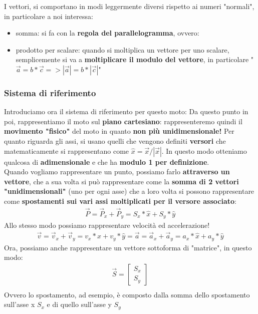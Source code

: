 				I vettori, si comportano in modi leggermente diversi rispetto ai numeri "normali", in particolare a noi interessa:
				\begin{itemize}
					\item somma: si fa con la \textbf{regola del parallelogramma}, ovvero:
					\item prodotto per scalare: quando si moltiplica un vettore per uno scalare, semplicemente si va a \textbf{moltiplicare il modulo del vettore}, in particolare "$\vec{a} = b * \vec{c} => |\vec{a}|= b * |\vec{c}|$"
				\end{itemize}

			\subsubsection{Sistema di riferimento}
				Introduciamo ora il sistema di riferimento per questo moto:
				Da questo punto in poi, rappresentiamo il moto sul \textbf{piano cartesiano}: rappresenteremo quindi il \textbf{movimento "fisico"} del moto in quanto \textbf{non più unidimensionale!} Per quanto riguarda gli assi, si usano quelli che vengono definiti \textbf{versori} che matematicamente si rappresentano come $\hat{x} = \vec{x}/|\vec{x}|$. In questo modo otteniamo qualcosa di \textbf{adimensionale} e che ha \textbf{modulo 1 per definizione}.
				\medskip\\
				Quando vogliamo rappresentare un punto, possiamo farlo \textbf{attraverso un vettore}, che a sua volta si può rappresentare come la \textbf{somma di 2 vettori "unidimensionali"} (uno per ogni asse) che a loro volta si possono rappresentare come \textbf{spostamenti sui vari assi moltiplicati per il versore associato}:
				\begin{align*}
					\vec{P} = \vec{P}_x + \vec{P}_y = S_x * \hat{x} + S_y * \hat{y}
				\end{align*}
				Allo stesso modo possiamo rappresentare velocità ed accelerazione!
				\begin{align*}
					\vec{v} = \vec{v}_x + \vec{v}_y = v_x * \hat{x} + v_y * \hat{y} =
					\vec{a} = \vec{a}_x + \vec{a}_y = a_x * \hat{x} + a_y * \hat{y}
				\end{align*}
				Ora, possiamo anche rappresentare un vettore sottoforma di "matrice", in questo modo:
				\begin{align*}
					\vec{S} =
					\begin{bmatrix}
						S_x\\
						S_y
					\end{bmatrix}\\
				\end{align*}
				Ovvero lo spostamento, ad esempio, è composto dalla somma dello spostamento sull'asse x $S_x$ e di quello sull'asse y $S_y$

